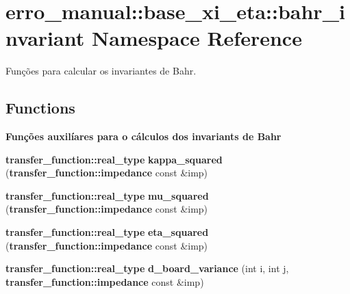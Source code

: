 \section{erro\_\-manual::base\_\-xi\_\-eta::bahr\_\-invariant Namespace Reference}
\label{namespaceerro__manual_1_1base__xi__eta_1_1bahr__invariant}
Funções para calcular os invariantes de Bahr.  


\subsection*{Functions}
\begin{Indent}{\bf Funções auxilíares para o cálculos dos invariants de Bahr}\par
\begin{CompactItemize}
\item 
{\bf transfer\_\-function::real\_\-type} \textbf{kappa\_\-squared} ({\bf transfer\_\-function::impedance} const \&imp)\label{namespaceerro__manual_1_1base__xi__eta_1_1bahr__invariant_6cd2e84f45dfa6f8def8e1bc3a3805c6}

\item 
{\bf transfer\_\-function::real\_\-type} \textbf{mu\_\-squared} ({\bf transfer\_\-function::impedance} const \&imp)\label{namespaceerro__manual_1_1base__xi__eta_1_1bahr__invariant_6b10762916da5d27079970d736e770c8}

\item 
{\bf transfer\_\-function::real\_\-type} \textbf{eta\_\-squared} ({\bf transfer\_\-function::impedance} const \&imp)\label{namespaceerro__manual_1_1base__xi__eta_1_1bahr__invariant_0fc25410104a4d1d76163c8670f6a85c}

\item 
{\bf transfer\_\-function::real\_\-type} \textbf{d\_\-board\_\-variance} (int i, int j, {\bf transfer\_\-function::impedance} const \&imp)\label{namespaceerro__manual_1_1base__xi__eta_1_1bahr__invariant_ed24b2b5874dcb3ffbebba1d8f9e7095}

\end{CompactItemize}
\end{Indent}
